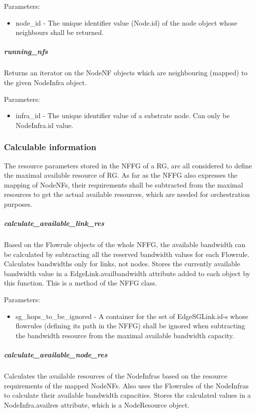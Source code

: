 \documentclass[a4paper,10pt]{scrartcl}
\begin{document}
Parameters:
\begin{itemize}
\item node\_id - The unique identifier value (Node.id) of the node object whose neighbours shall be returned. 
\end{itemize}

\subparagraph{running\_nfs}
Returns an iterator on the NodeNF objects which are neighbouring (mapped) to the given NodeInfra object.

Parameters:
\begin{itemize}
\item infra\_id - The unique identifier value of a substrate node. Can only be NodeInfra.id value.
\end{itemize}
	
\subsubsection{Calculable information}

The resource parameters stored in the NFFG of a RG, are all considered to define the maximal available resource of RG.
As far as the NFFG also expresses the mapping of NodeNFs, 
their requirements shall be subtracted from the maximal resources to get the actual available resources, 
which are needed for orchestration purposes.

\subparagraph{calculate\_available\_link\_res}
Based on the Flowrule objects of the whole NFFG, the available bandwidth can be calculated by subtracting all the 
reserved bandwidth values for each Flowrule. Calculates bandwidths only for links, not nodes. 
Stores the currently available bandwidth value in a EdgeLink.availbandwidth attribute added to each object by this function.
This is a method of the NFFG class.

Parameters:
\begin{itemize}
\item sg\_hops\_to\_be\_ignored - A container for the set of EdgeSGLink.id-s whose flowrules (defining its path in the NFFG)
shall be ignored when subtracting the bandwidth resource from the maximal available bandwidth capacity.
\end{itemize}

\subparagraph{calculate\_available\_node\_res}
Calculates the available resources of the NodeInfras based on the resource requirements of the mapped NodeNFs. 
Also uses the Flowrules of the NodeInfras to calculate their available bandwidth capacities. 
Stores the calculated values in a NodeInfra.availres attribute, which is a NodeResource object.
\end{document}
